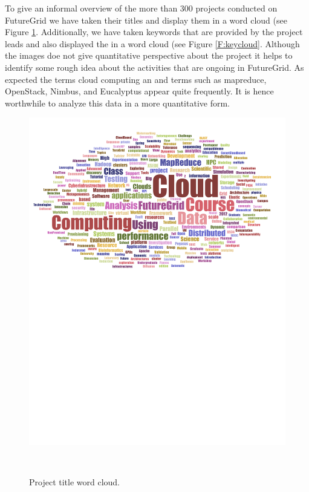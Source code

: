 \documentclass{article}
\begin{document}
To give an informal overview of the more than 300 projects conducted on FutureGrid we have taken their titles and display them in a word cloud (see Figure \ref{F:wordcloud}. Additionally, we have taken keywords that are provided by the project leads and also displayed the in a word cloud (see Figure \ref{F:keycloud}. Although the images doe not give quantitative perspective about the project it helps to identify some rough idea about the activities that are ongoing in FutureGrid.  As expected the terms cloud computing an and terms such as mapreduce, OpenStack, Nimbus, and Eucalyptus appear quite frequently. It is hence worthwhile to analyze this data in a more quantitative form.

\begin{figure}[p]
\begin{minipage}[t]{1.0\textwidth}
  \centering
    \includegraphics[width=1.0\textwidth]{images/fg-title-wordcloud.pdf}
  \caption{Project title word cloud.}\label{F:wordcloud}
\end{minipage}
\vspace{24pt}\\

\end{figure}
\end{document}
